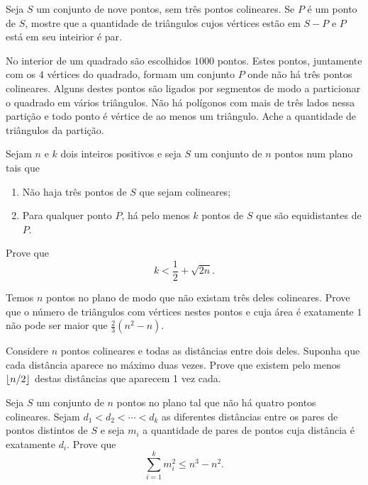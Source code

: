 \documentclass[10pt,a4paper]{article}
\begin{document}
	\begin{prob}[Ibero 2002]
		Seja $S$ um conjunto de nove pontos, sem três pontos colineares. Se $P$ é um ponto de $S$, mostre que a quantidade de triângulos cujos vértices estão em $S - {P}$ e $P$ está em seu inteirior é par.
	\end{prob}
	\begin{prob}
		No interior de um quadrado são escolhidos $1000$ pontos. Estes pontos, juntamente com os $4$ vértices do quadrado, formam um conjunto $P$ onde não há três pontos colineares. Alguns destes pontos são ligados por segmentos de modo a particionar o quadrado em vários triângulos. Não há polígonos com mais de três lados nessa partição e todo ponto é vértice de ao menos um triângulo. Ache a quantidade de triângulos da partição.
	\end{prob}
	\begin{prob}[IMO 1989]
		Sejam $n$ e $k$ dois inteiros positivos e seja $S$ um conjunto de $n$ pontos num plano tais que
		\begin{enumerate}[label = (\roman*)]
			\item Não haja três pontos de $S$ que sejam colineares;
			\item Para qualquer ponto $P$, há pelo menos $k$ pontos de $S$ que são equidistantes de $P$.
		\end{enumerate}

		Prove que $$k < \frac{1}{2} + \sqrt{2n}.$$
	\end{prob}
	\begin{prob}[Irã 2010]
		Temos $n$ pontos no plano de modo que não existam três deles colineares. Prove que o número de triângulos com vértices nestes pontos e cuja área é exatamente $1$ não pode ser maior que $\frac{2}{3}(n^2 - n)$.
	\end{prob}
	\begin{prob}
		Considere $n$ pontos colineares e todas as distâncias entre dois deles. Suponha que cada distância aparece no máximo duas vezes. Prove que existem pelo menos $\left \lfloor{n/2}\right \rfloor$ destas distâncias que aparecem 1 vez cada.
	\end{prob}
	\begin{prob}[China 2011]
		Seja $S$ um conjunto de $n$ pontos no plano tal que não há quatro pontos colineares. Sejam $d_1 < d_2 < \cdots < d_k$ as diferentes distâncias entre os pares de pontos distintos de $S$ e seja $m_i$ a quantidade de pares de pontos cuja distância é exatamente $d_i$. Prove que $$\sum_{i = 1}^{k} m_i^2 \le n^3 - n^2.$$
	\end{prob}
\end{document}
